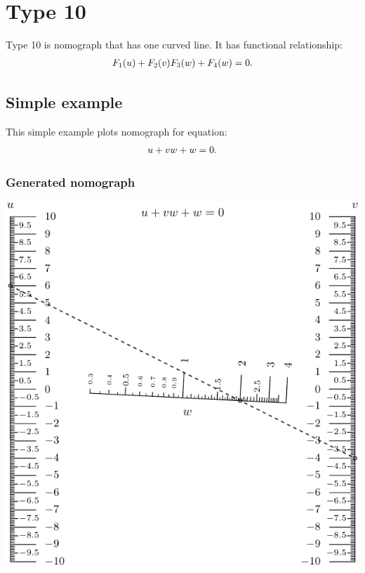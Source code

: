 \documentclass[a4paper,11pt,english]{sphinxmanual}
\begin{document}
\section{Type 10}
\label{types/types:type10-ref}\label{types/types:type-10}
Type 10 is nomograph that has one curved line. It has functional relationship:
\begin{gather}
\begin{split}F_1(u)+F_2(v)F_3(w)+F_4(w)=0.\end{split}\notag
\end{gather}

\subsection{Simple example}
\label{types/types:id69}
This simple example plots nomograph for equation:
\begin{gather}
\begin{split}u + v w + w = 0.\end{split}\notag
\end{gather}

\subsubsection{Generated nomograph}
\label{types/types:id70}
\includegraphics{ex_type10_nomo_1.pdf}
\end{document}

